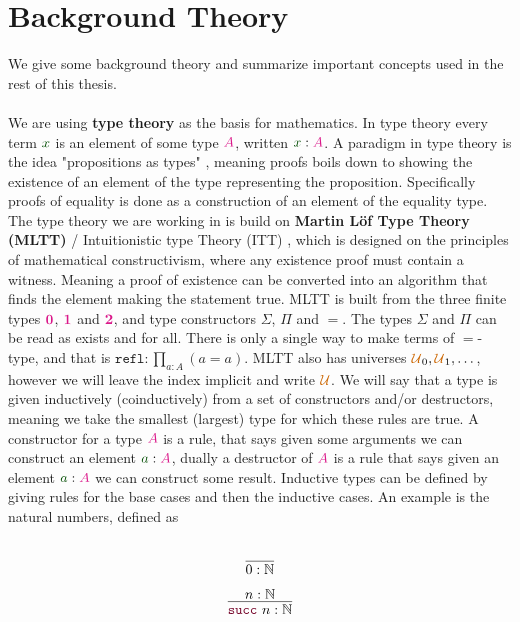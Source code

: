 \documentclass[twoside,11pt,openright]{report}
\theoremstyle{plain} %
\theoremstyle{definition}
\theoremstyle{remark}
\newcommand*{\term}[1]{\textcolor{green!30!black}{#1}} %
\newcommand*{\type}[1]{\textcolor{magenta!90!black}{#1}}
\newcommand*{\universe}[1]{\textcolor{orange!80!black}{#1}}
\newcommand*{\unit}{\type{\textbf{1}}}
\newcommand*{\empt}{\type{\textbf{0}}}
\newcommand*{\constructor}[1]{\textcolor{purple!60!black}{\ensuremath{\mathtt{#1}}}}
\begin{document}
\section{Background Theory}
We give some background theory and summarize important concepts used in the rest of this thesis. 
\\ \\
We are using \textbf{type theory} \cite{nlab:type_theory} as the basis for mathematics. In type theory every term \(\term{x}\) is an element of some type \(\type{A}\), written \(\term{x} : \type{A}\). A paradigm in type theory is the idea "propositions as types" \cite{nlab:propositions_as_types}, meaning proofs boils down to showing the existence of an element of the type representing the proposition. Specifically proofs of equality is done as a construction of an element of the equality type. The type theory we are working in is build on \textbf{Martin L\"of Type Theory (MLTT)} / Intuitionistic type Theory (ITT) \cite{nlab:martin-loef_dependent_type_theory}, which is designed on the principles of mathematical constructivism, where any existence proof must contain a witness. Meaning a proof of existence can be converted into an algorithm that finds the element making the statement true. MLTT is built from the three finite types \(\empt\), \(\unit\) and \(\type{\mathbf{2}}\), and type constructors \(\Sigma\), \(\Pi\) and \(=\). The types \(\Sigma\) and \(\Pi\) can be read as exists and for all. There is only a single way to make terms of \(=\)-type, and that is \(\mathtt{refl} : \prod_{a : A} (a = a)\). MLTT also has universes \(\universe{\mathcal{U}}_0, \universe{\mathcal{U}}_1, \dots\), however we will leave the index implicit and write \(\universe{\mathcal{U}}\).  We will say that a type is given inductively (coinductively) from a set of constructors and/or destructors, meaning we take the smallest (largest) type for which these rules are true. A constructor for a type \(\type{A}\) is a rule, that says given some arguments we can construct an element \(\term{a} : \type{A}\), dually a destructor of \(\type{A}\) is a rule that says given an element \(\term{a} : \type{A}\) we can construct some result. Inductive types can be defined by giving rules for the base cases and then the inductive cases. An example is the natural numbers, defined as\\[-10mm]
\begin{center}
  \strut
  \hfill
  \begin{minipage}{0.15\linewidth}
    \begin{equation}
      \vcenter{\infer{0 : \mathbb{N}}{\strut}}
    \end{equation}
  \end{minipage}
  \hfill
  \begin{minipage}{0.20\linewidth}
    \begin{equation}
      \vcenter{\infer{\constructor{succ}~n : \mathbb{N}}{n : \mathbb{N}}}
    \end{equation}
  \end{minipage}
  \hfill
  \strut
\end{center}
\end{document}
